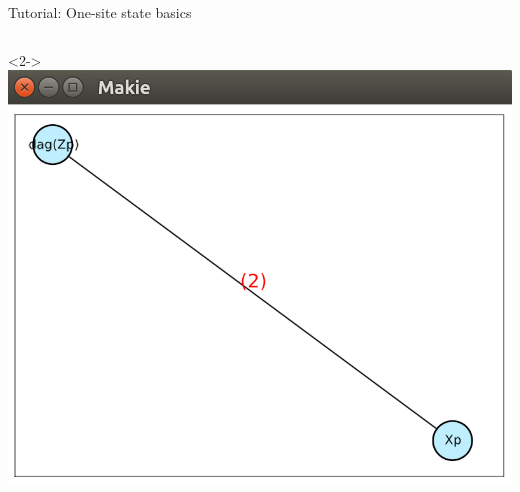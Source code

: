 \begin{frame}[fragile]{Tutorial: One-site state basics}
\begin{columns}
\begin{column}{4.5cm}
\begin{onlyenv}<2->
\includegraphics[width=1.0\textwidth]{
  slides/assets/ZpXp_glmakie.png
}
\end{onlyenv}

\end{column}

\end{columns}

\end{frame}
